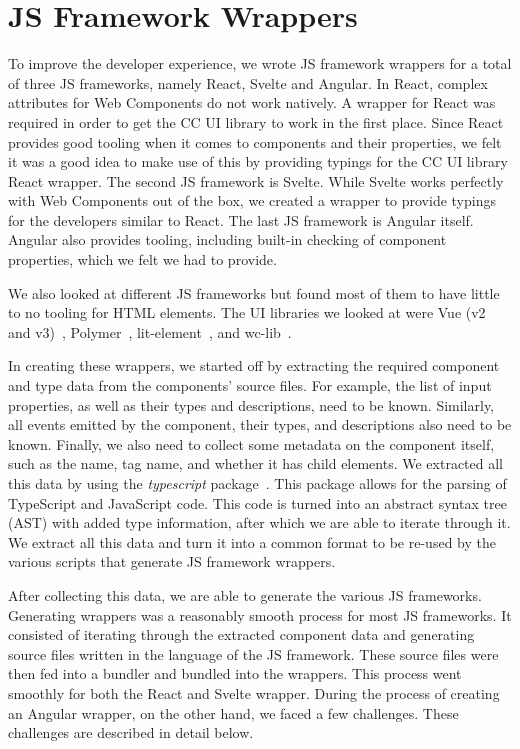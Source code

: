 \section{JS Framework Wrappers}\label{sec:js-framework-wrappers}
To improve the developer experience, we wrote JS framework wrappers for a total of three JS frameworks, namely React, Svelte and Angular. In React, complex attributes for Web Components do not work natively. A wrapper for React was required in order to get the CC UI library to work in the first place. Since React provides good tooling when it comes to components and their properties, we felt it was a good idea to make use of this by providing typings for the CC UI library React wrapper. The second JS framework is Svelte. While Svelte works perfectly with Web Components out of the box, we created a wrapper to provide typings for the developers similar to React. The last JS framework is Angular itself. Angular also provides tooling, including built-in checking of component properties, which we felt we had to provide.

We also looked at different JS frameworks but found most of them to have little to no tooling for HTML elements. The UI libraries we looked at were Vue (v2 and v3)~, Polymer~, lit-element~, and wc-lib~.

In creating these wrappers, we started off by extracting the required component and type data from the components' source files. For example, the list of input properties, as well as their types and descriptions, need to be known. Similarly, all events emitted by the component, their types, and descriptions also need to be known. Finally, we also need to collect some metadata on the component itself, such as the name, tag name, and whether it has child elements. We extracted all this data by using the \emph{typescript} package~. This package allows for the parsing of TypeScript and JavaScript code. This code is turned into an abstract syntax tree (AST) with added type information, after which we are able to iterate through it. We extract all this data and turn it into a common format to be re-used by the various scripts that generate JS framework wrappers.

After collecting this data, we are able to generate the various JS frameworks. Generating wrappers was a reasonably smooth process for most JS frameworks. It consisted of iterating through the extracted component data and generating source files written in the language of the JS framework. These source files were then fed into a bundler and bundled into the wrappers. This process went smoothly for both the React and Svelte wrapper. During the process of creating an Angular wrapper, on the other hand, we faced a few challenges. These challenges are described in detail below.

